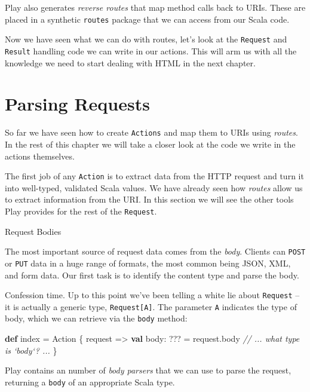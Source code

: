 \documentclass[oneside,11pt,a4paper,]{book}
\newenvironment{Shaded}{\begin{snugshade}}{\end{snugshade}}
\newcommand{\KeywordTok}[1]{\textcolor[rgb]{0.13,0.29,0.53}{\textbf{{#1}}}}
\newcommand{\CommentTok}[1]{\textcolor[rgb]{0.56,0.35,0.01}{\textit{{#1}}}}
\newcommand{\FunctionTok}[1]{\textcolor[rgb]{0.00,0.00,0.00}{{#1}}}
\newcommand{\NormalTok}[1]{{#1}}
\begin{document}
Play also generates \emph{reverse routes} that map method calls back to
URIs. These are placed in a synthetic \texttt{routes} package that we
can access from our Scala code.

Now we have seen what we can do with routes, let's look at the
\texttt{Request} and \texttt{Result} handling code we can write in our
actions. This will arm us with all the knowledge we need to start
dealing with HTML in the next chapter.

\section{Parsing Requests}\label{parsing-requests}

So far we have seen how to create \texttt{Actions} and map them to URIs
using \emph{routes}. In the rest of this chapter we will take a closer
look at the code we write in the actions themselves.

The first job of any \texttt{Action} is to extract data from the HTTP
request and turn it into well-typed, validated Scala values. We have
already seen how \emph{routes} allow us to extract information from the
URI. In this section we will see the other tools Play provides for the
rest of the \texttt{Request}.

Request Bodies

The most important source of request data comes from the \emph{body}.
Clients can \texttt{POST} or \texttt{PUT} data in a huge range of
formats, the most common being JSON, XML, and form data. Our first task
is to identify the content type and parse the body.

Confession time. Up to this point we've been telling a white lie about
\texttt{Request} -- it is actually a generic type,
\texttt{Request{[}A{]}}. The parameter \texttt{A} indicates the type of
body, which we can retrieve via the \texttt{body} method:

\begin{Shaded}
\begin{Highlighting}[]
\KeywordTok{def} \NormalTok{index = Action \{ request =>}
  \KeywordTok{val} \NormalTok{body: ??? = request.}\FunctionTok{body}
  \CommentTok{// ... what type is `body`? ...}
\NormalTok{\}}
\end{Highlighting}
\end{Shaded}

Play contains an number of \emph{body parsers} that we can use to parse
the request, returning a \texttt{body} of an appropriate Scala type.
\end{document}
